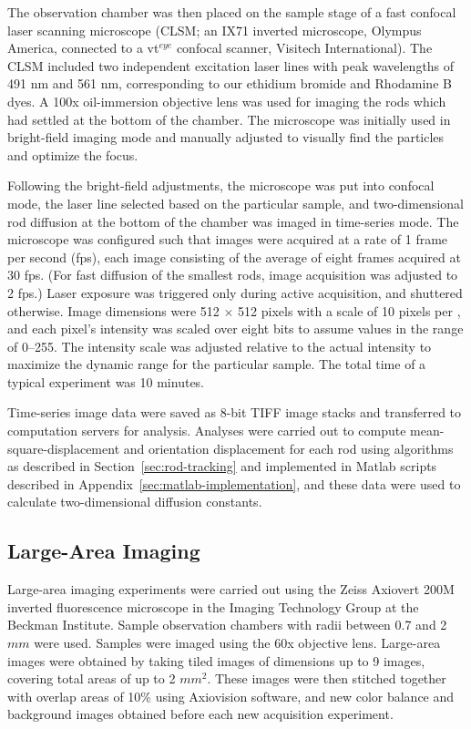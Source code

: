 The observation chamber was then placed on the sample stage of a fast confocal laser scanning microscope (CLSM; 
an IX71 inverted microscope, Olympus America, connected to a vt$^{eye}$ confocal scanner, Visitech International). The CLSM
included two independent excitation laser lines with peak wavelengths of 491 nm and 561 nm, corresponding to our ethidium 
bromide and Rhodamine B dyes.  A 100x oil-immersion objective lens was used for imaging the rods which had settled at the bottom
of the chamber.  The microscope was initially used in bright-field imaging mode and manually adjusted to 
visually find the particles and 
optimize the focus.

Following the bright-field adjustments, the microscope was put into confocal mode, the laser line selected 
based on the particular sample, and two-dimensional rod diffusion at the 
bottom of the chamber was imaged in time-series mode.  The microscope was configured such that images were acquired at
a rate of 1 frame per second (fps), 
each image consisting of the average of eight frames acquired at 30 fps.  
(For fast diffusion of the smallest rods,
image acquisition was adjusted to 2 fps.)  Laser exposure was triggered only during active 
acquisition, and shuttered otherwise.  Image dimensions were 512 $\times$ 512 pixels with a scale of 10 pixels
per \microns, and each pixel's intensity was scaled over eight bits to assume values in the range of 0--255.
The intensity scale was adjusted relative to the actual intensity to maximize the dynamic range for the particular sample.
The total time of a typical experiment was 10 minutes.

Time-series image data were saved as 8-bit TIFF image stacks and transferred to computation servers for analysis.
Analyses were carried out to compute mean-square-displacement and orientation displacement for each rod using algorithms as 
described in Section~\ref{sec:rod-tracking} and implemented in Matlab scripts described in 
Appendix~\ref{sec:matlab-implementation}, 
and these data
were used to calculate two-dimensional diffusion constants.  

\subsection{Large-Area Imaging}
\label{sec:tiled-microscopy}

Large-area imaging experiments were carried out using the 
Zeiss Axiovert 200M inverted fluorescence microscope in the Imaging Technology Group
at the Beckman Institute.  Sample observation chambers with radii between 0.7 and 2 $mm$ were used.
Samples were imaged using the 60x objective lens.  Large-area images were obtained by taking tiled images of dimensions 
up to 9  images, covering total areas of up to 2 $mm^2$.  These images were then stitched together with overlap 
areas of 10\% using Axiovision 
software, and new color balance and background images obtained before each new acquisition experiment.

